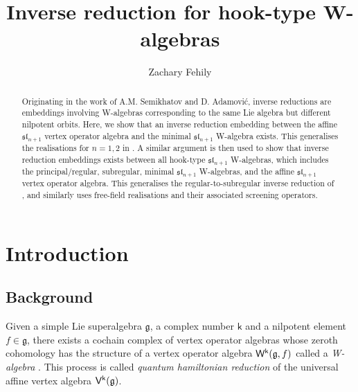 \documentclass[10pt,a4paper]{amsart}
\numberwithin{equation}{section}
\newcommand{\kk}{\mathsf{k}}   %
\DeclarePairedDelimiter{\brac}{\lparen}{\rparen}   %
\newcommand{\VOA}[1]{\mathsf{#1}}    %
\newcommand{\Wsymb}{\VOA{W}}
\newcommand{\uaffvoa}[2]{\VOA{V}^{#1}\brac{#2}}                   %
\newcommand{\uQHR}[3]{\Wsymb^{#1}\brac{#2,#3}}                    %
\theoremstyle{plain}
\begin{document}
\title[Inverse reduction for hook-type W-algebras]{Inverse reduction for hook-type W-algebras}

\author[Z~Fehily]{Zachary Fehily}
\address[Zachary Fehily]{
School of Mathematics and Statistics \\
University of Melbourne \\
Parkville, Australia, 3010.
}

\begin{abstract}
Originating in the work of A.M. Semikhatov and D. Adamovi\'c, inverse reductions are embeddings involving W-algebras corresponding to the same Lie algebra but different nilpotent orbits. Here, we show that an inverse reduction embedding between the affine $\mathfrak{sl}_{n+1}$ vertex operator algebra and the minimal $\mathfrak{sl}_{n+1}$ W-algebra exists. This generalises the realisations for $n=1,2$ in \cite{AdaRea17,ACG21}. A similar argument is then used to show that inverse reduction embeddings exists between all hook-type $\mathfrak{sl}_{n+1}$ W-algebras, which includes the principal/regular, subregular, minimal $\mathfrak{sl}_{n+1}$ W-algebras, and the affine $\mathfrak{sl}_{n+1}$ vertex operator algebra. This generalises the regular-to-subregular inverse reduction of \cite{Feh21c}, and similarly uses free-field realisations and their associated screening operators.


\end{abstract}

\maketitle

\onehalfspacing


\section{Introduction}

\subsection{Background}
Given a simple Lie superalgebra $\mathfrak{g}$, a complex number $\kk$ and a nilpotent element $f \in \mathfrak{g}$, there exists a cochain complex of vertex operator algebras whose zeroth cohomology has the structure of a vertex operator algebra $\uQHR{\kk}{\mathfrak{g}}{f}$ called a \emph{W-algebra} \cite{KacQua03, KacQua04}. This process is called \emph{quantum hamiltonian reduction} of the universal affine vertex algebra $\uaffvoa{\kk}{\mathfrak{g}}$. 
\end{document}
